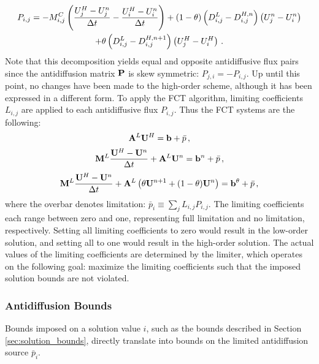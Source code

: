 \begin{multline}
  P_{i,j} = -M^C_{i,j}\pr{\frac{U^H_j - U^n_j}{\dt} - \frac{U^H_i - U^n_i}{\dt}}
    + (1-\theta)\pr{D^L_{i,j} - D^{H,n}_{i,j}}\pr{U^n_j - U^n_i}\\
    + \theta\pr{D^L_{i,j} - D^{H,n+1}_{i,j}}\pr{U^H_j - U^H_i} \eqp
\end{multline}
Note that this decomposition yields equal and opposite antidiffusive flux pairs
since the antidiffusion matrix $\P$ is skew symmetric: $P_{j,i}=-P_{i,j}$.
Up until this point, no changes have been made to the
high-order scheme, although it has been expressed in a different form.
To apply the FCT algorithm, limiting coefficients $L_{i,j}$ are applied to
each antidiffusive flux $P_{i,j}$. Thus the FCT systems are the following:
\begin{equation}\label{eq:fct_ss}
  \A^L \U^H = \ssrhs + \bar{p} \eqc
\end{equation}
\begin{equation}\label{eq:fct_fe}
  \M^L\frac{\U^H - \U^n}{\dt} + \A^L\U^n = \ssrhs^n + \bar{p} \eqc
\end{equation}
\begin{equation}\label{eq:fct_theta}
  \M^L\frac{\U^H - \U^n}{\dt} + \A^L\pr{\theta\U^{n+1} + (1-\theta)\U^n}
    = \ssrhs^\theta + \bar{p} \eqc
\end{equation}
where the overbar denotes limitation: $\bar{p}_i\equiv\sum_j L_{i,j}P_{i,j}$.
The limiting coefficients each range between zero and one, representing
full limitation and no limitation, respectively. Setting all limiting
coefficients to zero would result in the low-order solution, and setting
all to one would result in the high-order solution. The actual values of the
limiting coefficients are determined by the limiter, which operates on the
following goal: maximize the limiting coefficients such that the imposed
solution bounds are not violated.


\subsubsection{Antidiffusion Bounds}

Bounds imposed on a solution value $i$, such as the bounds described in Section
\ref{sec:solution_bounds}, directly translate into bounds on the limited
antidiffusion source $\bar{p}_i$.


